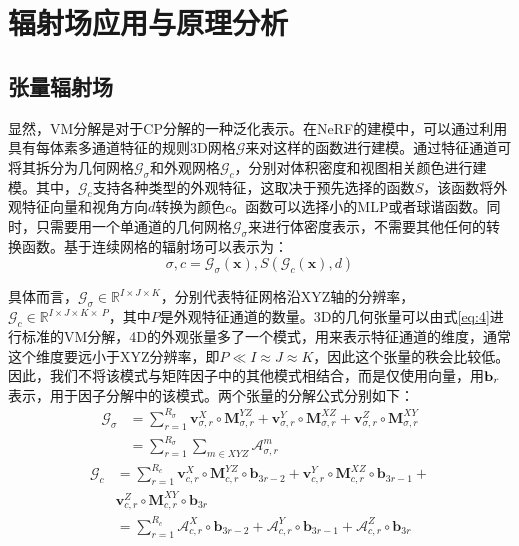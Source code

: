 \documentclass[10pt,twocolumn,letterpaper]{article}
\begin{document}
\section{辐射场应用与原理分析}
\label{sec:analysis}

\subsection{张量辐射场}
显然，VM分解是对于CP分解的一种泛化表示。在NeRF的建模中，可以通过利用具有每体素多通道特征的规则3D网格$\mathcal G$来对这样的函数进行建模。通过特征通道可将其拆分为几何网格$\mathcal G_σ$和外观网格$\mathcal G_c$，分别对体积密度和视图相关颜色进行建模。其中，$\mathcal G_c$支持各种类型的外观特征，这取决于预先选择的函数$S$，该函数将外观特征向量和视角方向$d$转换为颜色$c$。函数可以选择小的MLP或者球谐函数。同时，只需要用一个单通道的几何网格$\mathcal G_\sigma$来进行体密度表示，不需要其他任何的转换函数。基于连续网格的辐射场可以表示为：
\begin{equation}
  \sigma, c=\mathcal{G}_{\sigma}(\mathbf{x}), S\left(\mathcal{G}_{c}(\mathbf{x}), d\right)
\end{equation}
\label{eq:7}

具体而言，$\mathcal G_\sigma\in\mathbb R^{I\times J\times K}$，分别代表特征网格沿XYZ轴的分辨率，$\mathcal G_c\in\mathbb R^{I\times J\times K\times\ P }$，其中$P$是外观特征通道的数量。3D的几何张量可以由式\ref{eq:4}进行标准的VM分解，4D的外观张量多了一个模式，用来表示特征通道的维度，通常这个维度要远小于XYZ分辨率，即$P \ll I\approx J\approx K$，因此这个张量的秩会比较低。因此，我们不将该模式与矩阵因子中的其他模式相结合，而是仅使用向量，用$\bold b_r$表示，用于因子分解中的该模式。两个张量的分解公式分别如下：
\begin{equation}
  \begin{aligned}\mathcal{G}_{\sigma}&=\sum_{r=1}^{R_{\sigma}} \mathbf{v}_{\sigma, r}^{X} \circ \mathbf{M}_{\sigma, r}^{Y Z}+\mathbf{v}_{\sigma, r}^{Y} \circ \mathbf{M}_{\sigma, r}^{X Z}+\mathbf{v}_{\sigma, r}^{Z} \circ \mathbf{M}_{\sigma, r}^{X Y}\\&=\sum_{r=1}^{R_{\sigma}} \sum_{m \in X Y Z} \mathcal{A}_{\sigma, r}^{m}\end{aligned}
\end{equation}
\label{eq:8}
\begin{equation}
  \begin{aligned}\mathcal{G}_{c} & =\sum_{r=1}^{R_{c}} \mathbf{v}_{c, r}^{X} \circ \mathbf{M}_{c, r}^{Y Z} \circ \mathbf{b}_{3 r-2}+\mathbf{v}_{c, r}^{Y} \circ \mathbf{M}_{c, r}^{X Z} \circ \mathbf{b}_{3 r-1}+\\& \mathbf{v}_{c, r}^{Z} \circ \mathbf{M}_{c, r}^{X Y} \circ \mathbf{b}_{3 r} \\& =\sum_{r=1}^{R_{c}} \mathcal{A}_{c, r}^{X} \circ \mathbf{b}_{3 r-2}+\mathcal{A}_{c, r}^{Y} \circ \mathbf{b}_{3 r-1}+\mathcal{A}_{c, r}^{Z} \circ \mathbf{b}_{3 r}\end{aligned}
\end{equation}
\label{eq:9}
\end{document}
